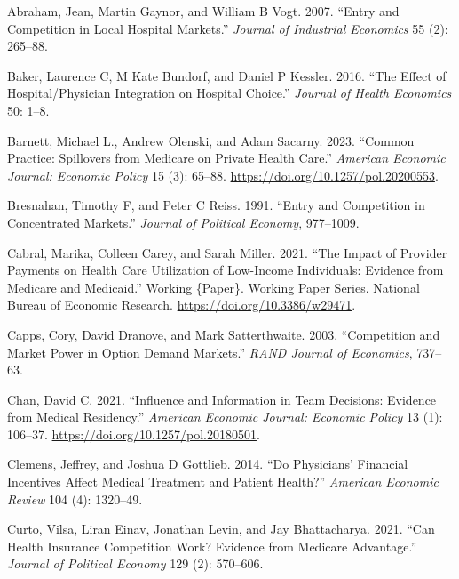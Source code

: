 \documentclass[
  letterpaper,
  DIV=11,
  numbers=noendperiod]{scrreport}
\newlength{\cslhangindent}
\newlength{\cslentryspacingunit} %
\newenvironment{CSLReferences}[2] %
 {%
  \setlength{\parindent}{0pt}
  \ifodd #1
  \let\oldpar\par
  \def\par{\hangindent=\cslhangindent\oldpar}
  \fi
  \setlength{\parskip}{#2\cslentryspacingunit}
 }%
 {}
\theoremstyle{definition}
\theoremstyle{remark}
\begin{document}
\hypertarget{refs}{}
\begin{CSLReferences}{1}{0}
\leavevmode{}%
Abraham, Jean, Martin Gaynor, and William B Vogt. 2007. {``Entry and
{Competition} in {Local} {Hospital} {Markets}.''} \emph{Journal of
Industrial Economics} 55 (2): 265--88.

\leavevmode{}%
Baker, Laurence C, M Kate Bundorf, and Daniel P Kessler. 2016. {``The
{Effect} of {Hospital}/{Physician} {Integration} on {Hospital}
{Choice}.''} \emph{Journal of Health Economics} 50: 1--8.

\leavevmode{}%
Barnett, Michael L., Andrew Olenski, and Adam Sacarny. 2023. {``Common
{Practice}: {Spillovers} from {Medicare} on {Private} {Health}
{Care}.''} \emph{American Economic Journal: Economic Policy} 15 (3):
65--88. \url{https://doi.org/10.1257/pol.20200553}.

\leavevmode{}%
Bresnahan, Timothy F, and Peter C Reiss. 1991. {``Entry and Competition
in Concentrated Markets.''} \emph{Journal of Political Economy},
977--1009.

\leavevmode{}%
Cabral, Marika, Colleen Carey, and Sarah Miller. 2021. {``The {Impact}
of {Provider} {Payments} on {Health} {Care} {Utilization} of
{Low}-{Income} {Individuals}: {Evidence} from {Medicare} and
{Medicaid}.''} Working \{Paper\}. Working {Paper} {Series}. National
Bureau of Economic Research. \url{https://doi.org/10.3386/w29471}.

\leavevmode{}%
Capps, Cory, David Dranove, and Mark Satterthwaite. 2003. {``Competition
and Market Power in Option Demand Markets.''} \emph{RAND Journal of
Economics}, 737--63.

\leavevmode{}%
Chan, David C. 2021. {``Influence and {Information} in {Team}
{Decisions}: {Evidence} from {Medical} {Residency}.''} \emph{American
Economic Journal: Economic Policy} 13 (1): 106--37.
\url{https://doi.org/10.1257/pol.20180501}.

\leavevmode{}%
Clemens, Jeffrey, and Joshua D Gottlieb. 2014. {``Do {Physicians}'
{Financial} {Incentives} {Affect} {Medical} {Treatment} and {Patient}
{Health}?''} \emph{American Economic Review} 104 (4): 1320--49.

\leavevmode{}%
Curto, Vilsa, Liran Einav, Jonathan Levin, and Jay Bhattacharya. 2021.
{``Can {Health} {Insurance} {Competition} {Work}? {Evidence} from
{Medicare} {Advantage}.''} \emph{Journal of Political Economy} 129 (2):
570--606.


\end{CSLReferences}
\end{document}
